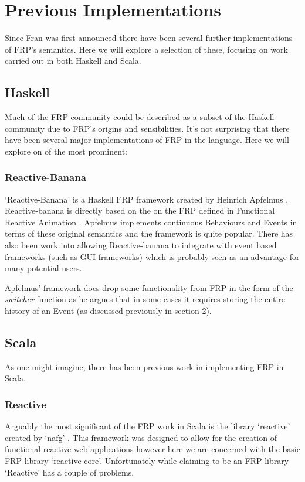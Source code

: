 \chapter{Previous Implementations}
  Since Fran was first announced there have been several further implementations of FRP's semantics. Here
  we will explore a selection of these, focusing on work carried out in both Haskell and Scala.
  
  \section{Haskell}
    Much of the FRP community could be described as a subset of the Haskell community due to FRP's
    origins and sensibilities. It's not surprising that there have been several major implementations
    of FRP in the language. Here we will explore on of the most prominent:
    
    \subsection{Reactive-Banana}
      `Reactive-Banana' is a Haskell FRP framework created by Heinrich Apfelmus \cite{Apfelmus}. Reactive-banana
      is directly based on the on the FRP defined in Functional Reactive Animation \cite{Elliott1997}. Apfelmus
      implements continuous Behaviours and Events in terms of these original semantics and the framework
      is quite popular. There has also been work into allowing Reactive-banana to integrate with event based
      frameworks (such as GUI frameworks) which is probably seen as an advantage for many potential users.
      
      Apfelmus' framework does drop some functionality from FRP in the form of the \emph{switcher} function as
      he argues that in some cases it requires storing the entire history of an Event (as discussed previously
      in section 2).
      

  \section{Scala}
    As one might imagine, there has been previous work in implementing FRP in Scala. 

    \subsection{Reactive}
      Arguably the most significant of the FRP work in Scala is the library `reactive' created by `nafg' \cite{Nafg}. This    
      framework was designed to allow for the creation of functional reactive web applications however here we are concerned 
      with the basic FRP library `reactive-core'. Unfortunately while claiming to be an FRP library `Reactive'
      has a couple of problems.

